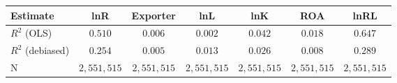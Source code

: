 \begin{tabular}{l*{6}{c}}
\hline\hline
 Estimate & lnR & Exporter & lnL & lnK & ROA & lnRL \\
\hline
\addlinespace $ R^2$ (OLS) & $0.510$ & $0.006$ & $0.002$ & $0.042$ & $0.018$ & $0.647$ \\
$ R^2$ (debiased) & $0.254$ & $0.005$ & $0.013$ & $0.026$ & $0.008$ & $0.289$ \\
N & $2,551,515$ & $2,551,515$ & $2,551,515$ & $2,551,515$ & $2,551,515$ & $2,551,515$ \\
\hline\hline
\end{tabular}
